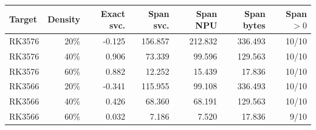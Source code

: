 \begin{tabular}{@{}lrrrrrr@{}}
\toprule
Target & Density & Exact svc. & Span svc. & Span NPU & Span bytes & Span $>0$ \\
\midrule
RK3576 & 20\% & -0.125 & 156.857 & 212.832 & 336.493 & 10/10 \\
RK3576 & 40\% & 0.906 & 73.339 & 99.596 & 129.563 & 10/10 \\
RK3576 & 60\% & 0.882 & 12.252 & 15.439 & 17.836 & 10/10 \\
\midrule
RK3566 & 20\% & -0.341 & 115.955 & 99.108 & 336.493 & 10/10 \\
RK3566 & 40\% & 0.426 & 68.360 & 68.191 & 129.563 & 10/10 \\
RK3566 & 60\% & 0.032 & 7.186 & 7.520 & 17.836 & 9/10 \\
\bottomrule
\end{tabular}
